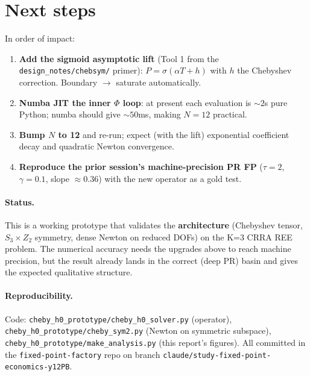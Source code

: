 \documentclass[11pt]{article}
\begin{document}
\section{Next steps}

In order of impact:
\begin{enumerate}
\item \textbf{Add the sigmoid asymptotic lift} (Tool 1 from the
\texttt{design\_notes/chebsym/} primer): $P = \sigma(\alpha T + h)$ with
$h$ the Chebyshev correction. Boundary $\to$ saturate automatically.
\item \textbf{Numba JIT the inner $\Phi$ loop}: at present each evaluation
is $\sim 2$s pure Python; numba should give $\sim 50$ms, making $N = 12$
practical.
\item \textbf{Bump $N$ to 12} and re-run; expect (with the lift)
exponential coefficient decay and quadratic Newton convergence.
\item \textbf{Reproduce the prior session's machine-precision PR FP}
($\tau = 2$, $\gamma = 0.1$, slope $\approx 0.36$) with the new operator
as a gold test.
\end{enumerate}

\paragraph{Status.} This is a working prototype that validates the
\textbf{architecture} (Chebyshev tensor, $S_3 \times Z_2$ symmetry, dense
Newton on reduced DOFs) on the K=3 CRRA REE problem. The numerical accuracy
needs the upgrades above to reach machine precision, but the result already
lands in the correct (deep PR) basin and gives the expected qualitative
structure.

\paragraph{Reproducibility.} Code:
\texttt{cheby\_h0\_prototype/cheby\_h0\_solver.py} (operator),
\texttt{cheby\_h0\_prototype/cheby\_sym2.py} (Newton on symmetric subspace),
\texttt{cheby\_h0\_prototype/make\_analysis.py} (this report's figures).
All committed in the \texttt{fixed-point-factory} repo on branch
\texttt{claude/study-fixed-point-economics-y12PB}.
\end{document}
